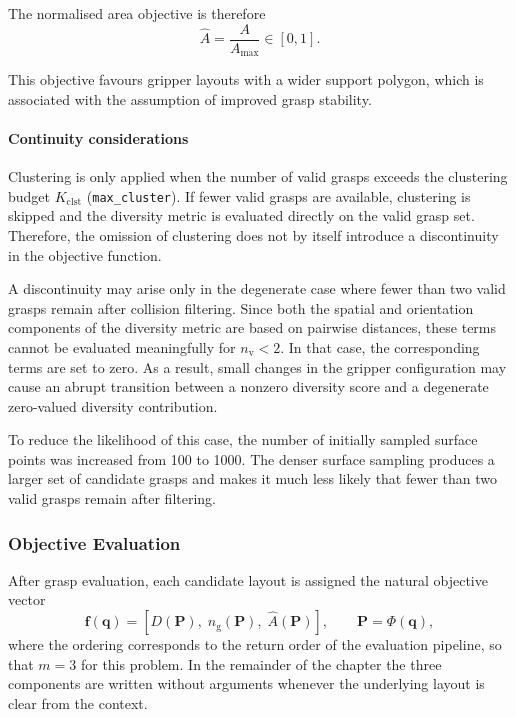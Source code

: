 \begin{enumerate}
The normalised area objective is therefore
\begin{equation}
    \hat{A} = \frac{A}{A_{\max}} \in [0,1].
\end{equation}

This objective favours gripper layouts with a wider support polygon, which is associated with the assumption of 
improved grasp stability.

\paragraph{Continuity considerations}
Clustering is only applied when the number of valid grasps exceeds the clustering budget
$K_{\mathrm{clst}}$ (\texttt{max\_cluster}). If fewer valid grasps are available, clustering is
skipped and the diversity metric is evaluated directly on the valid grasp set. Therefore, the
omission of clustering does not by itself introduce a discontinuity in the objective function.

A discontinuity may arise only in the degenerate case where fewer than two valid grasps remain after
collision filtering. Since both the spatial and orientation components of the diversity metric are
based on pairwise distances, these terms cannot be evaluated meaningfully for $n_{\mathrm{v}} < 2$.
In that case, the corresponding terms are set to zero. As a result, small changes in the gripper
configuration may cause an abrupt transition between a nonzero diversity score and a degenerate
zero-valued diversity contribution.

To reduce the likelihood of this case, the number of initially sampled surface points was increased
from 100 to 1000. The denser surface sampling produces a larger set of candidate grasps and makes it
much less likely that fewer than two valid grasps remain after filtering.
\end{enumerate}

\subsubsection{Objective Evaluation}

After grasp evaluation, each candidate layout is assigned the natural objective vector
\begin{equation}
    \mathbf{f}(\mathbf{q})
    =
    \left[
        D(\mathbf{P}),\;
        \hat{n}_{\mathrm{g}}(\mathbf{P}),\;
        \hat{A}(\mathbf{P})
    \right],
    \qquad
    \mathbf{P} = \Phi(\mathbf{q}),
\end{equation}
where the ordering corresponds to the return order of the evaluation pipeline, so that $m = 3$ for
this problem. In the remainder of the chapter the three components are written without arguments
whenever the underlying layout is clear from the context.


